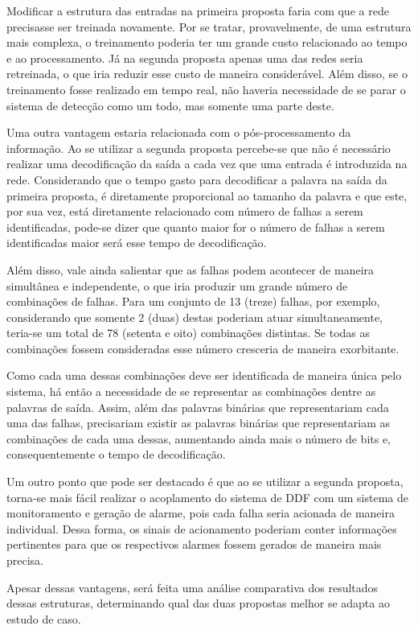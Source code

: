 Modificar a estrutura das entradas na primeira proposta faria com que a rede
precisasse ser treinada novamente. Por se tratar, provavelmente, de uma
estrutura mais complexa, o treinamento poderia ter um grande custo relacionado
ao tempo e ao processamento. Já na segunda proposta apenas uma das redes seria
retreinada, o que iria reduzir esse custo de maneira considerável. Além disso,
se o treinamento fosse realizado em tempo real, não haveria necessidade de se
parar o sistema de detecção como um todo, mas somente uma parte deste. 

Uma outra vantagem estaria relacionada com o pós-processamento da informação. Ao
se utilizar a segunda proposta percebe-se que não é necessário realizar uma
decodificação da saída a cada vez que uma entrada é introduzida na rede.
Considerando que o tempo gasto para decodificar a palavra na saída da primeira
proposta, é diretamente proporcional ao tamanho da palavra e que este, por sua
vez, está diretamente relacionado com número de falhas a serem identificadas,
pode-se dizer que quanto maior for o número de falhas a serem identificadas
maior será esse tempo de decodificação.

Além disso, vale ainda salientar que as falhas podem acontecer de maneira
simultânea e independente, o que iria produzir um grande número de combinações
de falhas. Para um conjunto de 13 (treze) falhas, por exemplo, considerando que
somente 2 (duas) destas poderiam atuar simultaneamente, teria-se um total de 78
(setenta e oito) combinações distintas. Se todas as combinações fossem
consideradas esse número cresceria de maneira exorbitante.

Como cada uma dessas combinações deve ser identificada de maneira única pelo
sistema, há então a necessidade de se representar as combinações dentre as
palavras de saída. Assim, além das palavras binárias que representariam cada uma
das falhas, precisariam existir as palavras binárias que representariam as
combinações de cada uma dessas, aumentando ainda mais o número de bits e,
consequentemente o tempo de decodificação.

Um outro ponto que pode ser destacado é que ao se utilizar a segunda proposta,
torna-se mais fácil realizar o acoplamento do sistema de DDF com um sistema de
monitoramento e geração de alarme, pois cada falha seria acionada de maneira
individual. Dessa forma, os sinais de acionamento poderiam conter informações
pertinentes para que os respectivos alarmes fossem gerados de maneira mais
precisa.

Apesar dessas vantagens, será feita uma análise comparativa dos resultados
dessas estruturas, determinando qual das duas propostas melhor se adapta ao
estudo de caso.

